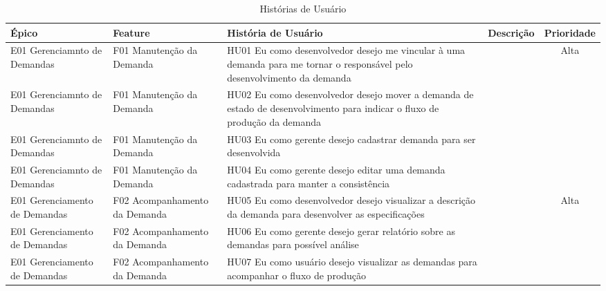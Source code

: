 \begin{table}[H]
	\begin{turn}{90}
		\begin{tabular}{|>{\centering}p{4cm}|>{\centering}p{4cm}|>{\centering}p{6cm}|>{\centering}p{6cm}|c|}
			\hline 
			Épico & Feature & História de Usuário & Descrição & Prioridade\tabularnewline
			\hline 
			\hline
			\label{HU01}
			E01 Gerenciamnto de Demandas & F01 Manutenção da Demanda & HU01 Eu como desenvolvedor desejo me vincular à uma demanda para me tornar
			o responsável pelo desenvolvimento da demanda &  & Alta\tabularnewline
			\hline 
			\label{HU02}
			E01 Gerenciamnto de Demandas & F01 Manutenção da Demanda & HU02 Eu como desenvolvedor desejo mover a demanda de estado de desenvolvimento
			para indicar o fluxo de produção da demanda &  & \tabularnewline
			\hline 
			\label{HU03}
			E01 Gerenciamnto de Demandas & F01 Manutenção da Demanda & HU03 Eu como gerente desejo cadastrar demanda para ser desenvolvida &  & \tabularnewline
			\hline 
			E01 Gerenciamnto de Demandas & F01 Manutenção da Demanda & HU04 Eu como gerente desejo editar uma demanda cadastrada para manter a
			consistência &  & \tabularnewline
			\hline 
			E01 Gerenciamento de Demandas & F02 Acompanhamento da Demanda & HU05 Eu como desenvolvedor desejo visualizar a descrição da demanda para
			desenvolver as especificações &  & Alta\tabularnewline
			\hline 
			E01 Gerenciamento de Demandas & F02 Acompanhamento da Demanda & HU06 Eu como gerente desejo gerar relatório sobre as demandas para possível
			análise &  & \tabularnewline
			\hline 
			E01 Gerenciamento de Demandas & F02 Acompanhamento da Demanda & HU07 Eu como usuário desejo visualizar as demandas para acompanhar o fluxo
			de produção &  & \tabularnewline
			\hline 
		\end{tabular}
	\end{turn}
	\caption{Histórias de Usuário}
	\label{Historias1}
\end{table}

